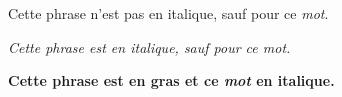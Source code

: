 \documentclass{article}
\begin{document}
Cette phrase n'est pas en italique, sauf pour ce \emph{mot}.

\textit{Cette phrase est en italique, sauf pour ce \emph{mot}.}

\textbf{Cette phrase est en gras et ce \emph{mot} en italique.}
\end{document}
